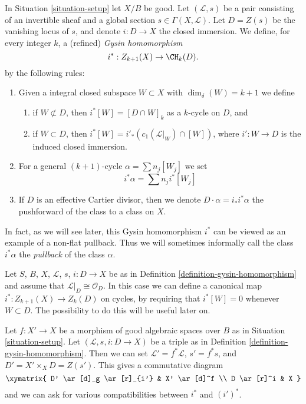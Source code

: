 \begin{definition}
\label{definition-gysin-homomorphism}
In Situation \ref{situation-setup} let $X/B$ be good.
Let $(\mathcal{L}, s)$ be a pair consisting of an invertible
sheaf and a global section $s \in \Gamma(X, \mathcal{L})$.
Let $D = Z(s)$ be the vanishing locus of $s$, and
denote $i : D \to X$ the closed immersion.
We define, for every integer $k$, a (refined) {\it Gysin homomorphism}
$$
i^* : Z_{k + 1}(X) \to \CH_k(D).
$$
by the following rules:
\begin{enumerate}
\item Given a integral closed subspace $W \subset X$ with
$\dim_\delta(W) = k + 1$ we define
\begin{enumerate}
\item if $W \not \subset D$, then $i^*[W] = [D \cap W]_k$ as a
$k$-cycle on $D$, and
\item if $W \subset D$, then
$i^*[W] = i'_*(c_1(\mathcal{L}|_W) \cap [W])$,
where $i' : W \to D$ is the induced closed immersion.
\end{enumerate}
\item For a general $(k + 1)$-cycle $\alpha = \sum n_j[W_j]$
we set
$$
i^*\alpha = \sum n_j i^*[W_j]
$$
\item If $D$ is an effective Cartier divisor, then we denote
$D \cdot \alpha = i_*i^*\alpha$ the pushforward of
the class to a class on $X$.
\end{enumerate}
\end{definition}

\noindent
In fact, as we will see later, this Gysin homomorphism $i^*$ can be viewed
as an example of a non-flat pullback. Thus we will sometimes informally
call the class $i^*\alpha$ the {\it pullback} of the class $\alpha$.

\begin{remark}
\label{remark-on-cycles}
Let $S$, $B$, $X$, $\mathcal{L}$, $s$, $i : D \to X$ be as in
Definition \ref{definition-gysin-homomorphism} and assume
that $\mathcal{L}|_D \cong \mathcal{O}_D$. In this case we
can define a canonical map $i^* : Z_{k + 1}(X) \to Z_k(D)$
on cycles, by requiring that $i^*[W] = 0$ whenever $W \subset D$.
The possibility to do this will be useful later on.
\end{remark}

\begin{remark}
\label{remark-pullback-pairs}
Let $f : X' \to X$ be a morphism of good algebraic spaces over $B$
as in Situation \ref{situation-setup}. Let $(\mathcal{L}, s, i : D \to X)$
be a triple as in Definition \ref{definition-gysin-homomorphism}.
Then we can set $\mathcal{L}' = f^*\mathcal{L}$, $s' = f^*s$, and
$D' = X' \times_X D = Z(s')$. This gives a commutative diagram
$$
\xymatrix{
D' \ar[d]_g \ar[r]_{i'} & X' \ar[d]^f \\
D \ar[r]^i & X
}
$$
and we can ask for various compatibilities between $i^*$ and $(i')^*$.
\end{remark}

